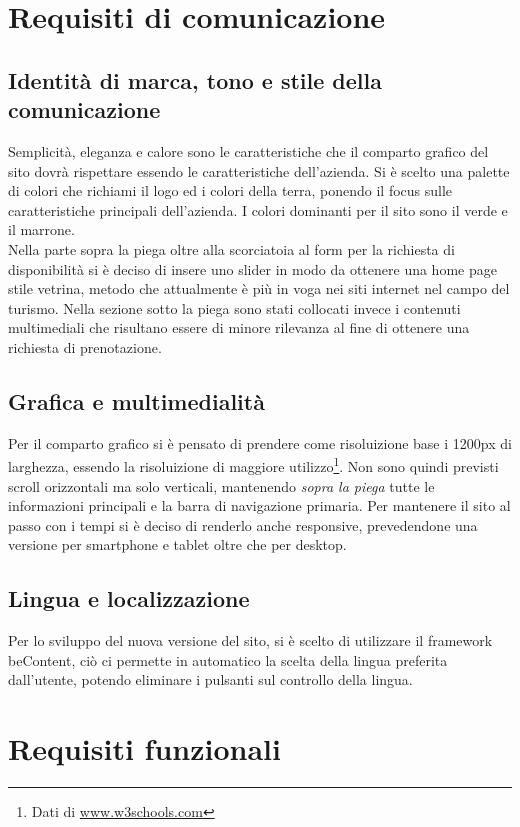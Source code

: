 \documentclass[a4paper,12pt,hidelinks]{report}
\begin{document}
\section{Requisiti di comunicazione}
  \subsection{Identità di marca, tono e stile della comunicazione}
    Semplicità, eleganza e calore sono le caratteristiche che il comparto grafico del sito dovrà rispettare essendo le caratteristiche dell'azienda. 
    Si è scelto una palette di colori che richiami il logo ed i colori della terra, ponendo il focus sulle caratteristiche principali dell'azienda. 
    I colori dominanti per il sito sono il verde e il marrone. 
    \\Nella parte sopra la piega oltre alla scorciatoia al form per la richiesta di disponibilità si è deciso di insere uno slider in modo da ottenere una home page
    stile vetrina, metodo che attualmente è più in voga nei siti internet nel campo del turismo. 
    Nella sezione sotto la piega sono stati collocati invece i contenuti multimediali che risultano essere di minore rilevanza al fine di ottenere una richiesta
    di prenotazione.

  \subsection{Grafica e multimedialità}
    Per il comparto grafico si è pensato di prendere come risoluizione base i 1200px di larghezza, essendo la risoluizione 
    di maggiore utilizzo\footnote{Dati di \url{www.w3schools.com}}.
    Non sono quindi previsti scroll orizzontali ma solo verticali, mantenendo \textit{sopra la piega} tutte le informazioni principali e la barra di navigazione primaria.
    Per mantenere il sito al passo con i tempi si è deciso di renderlo anche responsive, prevedendone una versione per smartphone e tablet oltre che per desktop.
  
  \subsection{Lingua e localizzazione}
    Per lo sviluppo del nuova versione del sito, si è scelto di utilizzare il framework beContent, ciò ci permette in automatico la scelta della lingua preferita dall'utente,
    potendo eliminare i pulsanti sul controllo della lingua. 

\section{Requisiti funzionali}
\end{document}

